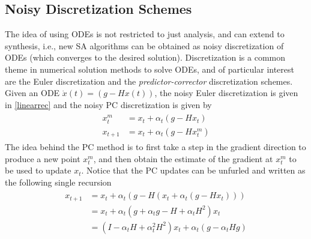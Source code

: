 \subsection{Noisy Discretization Schemes}
The idea of using ODEs is not restricted to just analysis, and can extend to synthesis, i.e., new SA algorithms can be obtained as noisy discretization of ODEs (which converges to the desired solution). Discretization is a common theme in numerical solution methods to solve ODEs, and of particular interest are the Euler discretization and the \emph{predictor-corrector} discretization schemes. Given an ODE $\dot{x}(t)=(g-Hx(t))$, the noisy Euler discretization is given in \eqref{linearrec} and the noisy PC discretization is given by
\begin{align}\label{PC}
\begin{split}
x^m_{t}&=x_t+\alpha_t(g-Hx_t)\\
x_{t+1}&=x_t+\alpha_t(g-Hx^m_t)
\end{split}
\end{align}
The idea behind the PC method is to first take a step in the gradient direction to produce a new point $x^m_t$, and then obtain the estimate of the gradient at $x^m_t$ to be used to update $x_t$. Notice that the PC updates can be unfurled and written as the following single recursion
\begin{align*}
\begin{split}
x_{t+1}&=x_t+\alpha_t(g-H(x_t+\alpha_t(g-Hx_t)))\\
&=x_t+\alpha_t(g+\alpha_t g- H +\alpha_t H^2)x_t \\
&= (I-\alpha_t H+\alpha_t^2 H^2)x_t+\alpha_t(g-\alpha_t H g)
\end{split}
\end{align*}